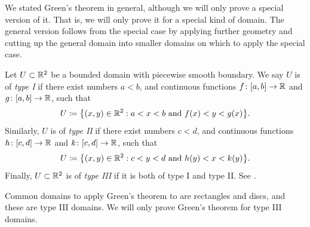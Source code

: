 We stated Green's theorem in general, although we will only prove a special 
version of it.  That is, we will only prove it for a special kind of domain.
The general version follows from the special case 
by applying further geometry and cutting up the general
domain into smaller domains on which to apply the special case.

Let $U \subset {\mathbb{R}}^2$ be a bounded domain with piecewise smooth boundary.
We say $U$ is of \emph{type I}
if there exist numbers
$a < b$, and continuous
functions $f \colon [a,b] \to {\mathbb{R}}$ and
$g \colon [a,b] \to {\mathbb{R}}$, such that
\begin{equation*}
U \coloneqq \bigl\{ (x,y) \in {\mathbb{R}}^2 : a < x < b \text{ and } f(x) < y < g(x) \bigr\} .
\end{equation*}
Similarly, $U$ is of \emph{type II}
if there exist numbers
$c < d$, and continuous
functions $h \colon [c,d] \to {\mathbb{R}}$ and
$k \colon [c,d] \to {\mathbb{R}}$, such that
\begin{equation*}
U \coloneqq \bigl\{ (x,y) \in {\mathbb{R}}^2 : c < y < d \text{ and } h(y) < x < k(y) \bigr\} .
\end{equation*}
Finally, $U \subset {\mathbb{R}}^2$ is of \emph{type III}
if it is both of type I and type II\@.  See .

\begin{myfigureht}
\caption{Domain types for Green's theorem.\label{fig:greenstypes}}
\end{myfigureht}

Common domains to apply Green's theorem to are rectangles and discs, and
these are type III domains.
We will only prove Green's theorem for type III domains.

